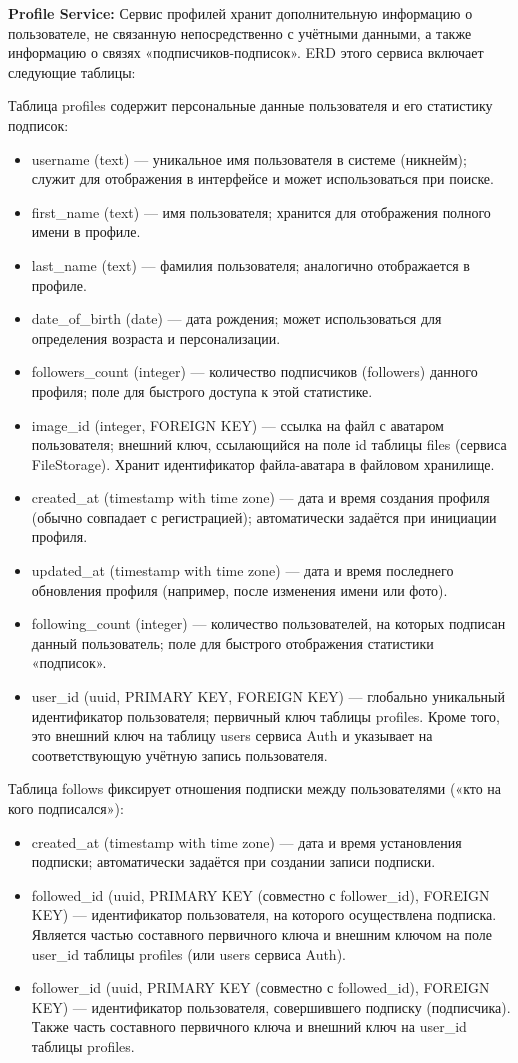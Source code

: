 \textbf{Profile Service:} Сервис профилей хранит дополнительную информацию о пользователе, не связанную непосредственно с учётными данными, а также информацию о связях «подписчиков-подписок». ERD этого сервиса включает следующие таблицы:

Таблица profiles содержит персональные данные пользователя и его статистику подписок:
\begin{itemize}
    \item username (text) — уникальное имя пользователя в системе (никнейм); служит для отображения в интерфейсе и может использоваться при поиске.
    \item first\_name (text) — имя пользователя; хранится для отображения полного имени в профиле.
    \item last\_name (text) — фамилия пользователя; аналогично отображается в профиле.
    \item date\_of\_birth (date) — дата рождения; может использоваться для определения возраста и персонализации.
    \item followers\_count (integer) — количество подписчиков (followers) данного профиля; поле для быстрого доступа к этой статистике.
    \item image\_id (integer, FOREIGN KEY) — ссылка на файл с аватаром пользователя; внешний ключ, ссылающийся на поле id таблицы files (сервиса FileStorage). Хранит идентификатор файла-аватара в файловом хранилище.
    \item created\_at (timestamp with time zone) — дата и время создания профиля (обычно совпадает с регистрацией); автоматически задаётся при инициации профиля.
    \item updated\_at (timestamp with time zone) — дата и время последнего обновления профиля (например, после изменения имени или фото).
    \item following\_count (integer) — количество пользователей, на которых подписан данный пользователь; поле для быстрого отображения статистики «подписок».
    \item user\_id (uuid, PRIMARY KEY, FOREIGN KEY) — глобально уникальный идентификатор пользователя; первичный ключ таблицы profiles. Кроме того, это внешний ключ на таблицу users сервиса Auth и указывает на соответствующую учётную запись пользователя.
\end{itemize}
\noindent Таблица follows фиксирует отношения подписки между пользователями («кто на кого подписался»):
\begin{itemize}
    \item created\_at (timestamp with time zone) — дата и время установления подписки; автоматически задаётся при создании записи подписки.
    \item followed\_id (uuid, PRIMARY KEY (совместно с follower\_id), FOREIGN KEY) — идентификатор пользователя, на которого осуществлена подписка. Является частью составного первичного ключа и внешним ключом на поле user\_id таблицы profiles (или users сервиса Auth).
    \item follower\_id (uuid, PRIMARY KEY (совместно с followed\_id), FOREIGN KEY) — идентификатор пользователя, совершившего подписку (подписчика). Также часть составного первичного ключа и внешний ключ на user\_id таблицы profiles.
\end{itemize}
